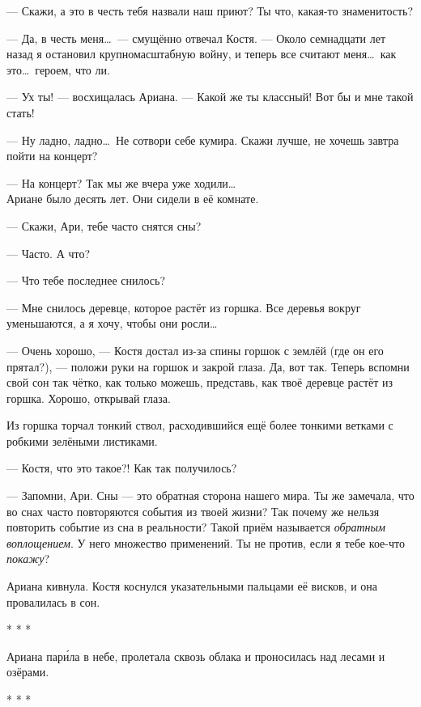 \documentclass[openany, oneside]{book}
\begin{document}
--- Скажи, а это в честь тебя назвали наш приют? Ты что, какая-то знаменитость?

--- Да, в честь меня\dots \ --- смущённо отвечал Костя. --- Около семнадцати лет назад я остановил крупномасштабную войну, и теперь все считают меня\dots \ как это\dots \ героем, что ли.

--- Ух ты! --- восхищалась Ариана. --- Какой же ты классный! Вот бы и мне такой стать!

--- Ну ладно, ладно\dots \ Не сотвори себе кумира. Скажи лучше, не хочешь завтра пойти на концерт?

--- На концерт? Так мы же вчера уже ходили\dots\\

Ариане было десять лет. Они  сидели в её комнате.

--- Скажи, Ари, тебе часто снятся сны?

--- Часто. А что?

--- Что тебе последнее снилось?

--- Мне снилось деревце, которое растёт из горшка. Все деревья вокруг уменьшаются, а я хочу, чтобы они росли\dots

--- Очень хорошо, --- Костя достал из-за спины горшок с землёй (где он его прятал?), --- положи руки на горшок и закрой глаза. Да, вот так. Теперь вспомни свой сон так чётко, как только можешь, представь, как твоё деревце растёт из горшка. Хорошо, открывай глаза.

Из горшка торчал тонкий ствол, расходившийся ещё более тонкими ветками с робкими зелёными листиками.

--- Костя, что это такое?! Как так получилось?

--- Запомни, Ари. Сны --- это обратная сторона нашего мира. Ты же замечала, что во снах часто повторяются события из твоей жизни? Так почему же нельзя повторить событие из сна в реальности? Такой приём называется \textit{обратным воплощением}. У него множество применений. Ты не против, если я тебе кое-что \textit{покажу}?

Ариана кивнула. Костя коснулся указательными пальцами её висков, и она провалилась в сон.

\begin{center}
    * * *
\end{center}

Ариана пар\'{и}ла в небе, пролетала сквозь облака и проносилась над лесами и озёрами.

\begin{center}
    * * *
\end{center}
\end{document}
